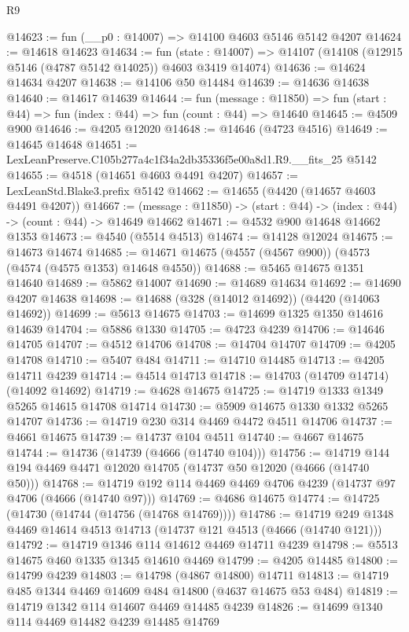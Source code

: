 \begin{lexlean}{R9}
\begin{coremodule}
@14623 := fun (__p0 : @14007) => @14100 @4603 @5146 @5142 @4207
@14624 := @14618 @14623
@14634 := fun (state : @14007) =>
  @14107 (@14108 (@12915 @5146 (@4787 @5142 @14025)) @4603 @3419 @14074)
@14636 := @14624 @14634 @4207
@14638 := @14106 @50 @14484
@14639 := @14636 @14638
@14640 := @14617 @14639
@14644 := fun (message : @11850) =>
  fun (start : @44) => fun (index : @44) => fun (count : @44) => @14640
@14645 := @4509 @900
@14646 := @4205 @12020
@14648 := @14646 (@4723 @4516)
@14649 := @14645 @14648
@14651 := LexLeanPreserve.C105b277a4c1f34a2db35336f5e00a8d1.R9.__fits_25 @5142
@14655 := @4518 (@14651 @4603 @4491 @4207)
@14657 := LexLeanStd.Blake3.prefix @5142
@14662 := @14655 (@4420 (@14657 @4603 @4491 @4207))
@14667 := (message : @11850) -> (start : @44) -> (index : @44) -> (count : @44) -> @14649 @14662
@14671 := @4532 @900 @14648 @14662 @1353
@14673 := @4540 (@5514 @4513)
@14674 := @14128 @12024
@14675 := @14673 @14674
@14685 := @14671 @14675 (@4557 (@4567 @900)) (@4573 (@4574 (@4575 @1353) @14648 @4550))
@14688 := @5465 @14675 @1351 @14640
@14689 := @5862 @14007
@14690 := @14689 @14634
@14692 := @14690 @4207 @14638
@14698 := @14688 (@328 (@14012 @14692)) (@4420 (@14063 @14692))
@14699 := @5613 @14675
@14703 := @14699 @1325 @1350 @14616 @14639
@14704 := @5886 @1330
@14705 := @4723 @4239
@14706 := @14646 @14705
@14707 := @4512 @14706
@14708 := @14704 @14707
@14709 := @4205 @14708
@14710 := @5407 @484
@14711 := @14710 @14485
@14713 := @4205 @14711 @4239
@14714 := @4514 @14713
@14718 := @14703 (@14709 @14714) (@14092 @14692)
@14719 := @4628 @14675
@14725 := @14719 @1333 @1349 @5265 @14615 @14708 @14714
@14730 := @5909 @14675 @1330 @1332 @5265 @14707
@14736 := @14719 @230 @314 @4469 @4472 @4511 @14706
@14737 := @4661 @14675
@14739 := @14737 @104 @4511
@14740 := @4667 @14675
@14744 := @14736 (@14739 (@4666 (@14740 @104)))
@14756 := @14719 @144 @194 @4469 @4471 @12020 @14705 (@14737 @50 @12020 (@4666 (@14740 @50)))
@14768 := @14719 @192 @114 @4469 @4469 @4706 @4239 (@14737 @97 @4706 (@4666 (@14740 @97)))
@14769 := @4686 @14675
@14774 := @14725 (@14730 (@14744 (@14756 (@14768 @14769))))
@14786 := @14719 @249 @1348 @4469 @14614 @4513 @14713 (@14737 @121 @4513 (@4666 (@14740 @121)))
@14792 := @14719 @1346 @114 @14612 @4469 @14711 @4239
@14798 := @5513 @14675 @460 @1335 @1345 @14610 @4469
@14799 := @4205 @14485
@14800 := @14799 @4239
@14803 := @14798 (@4867 @14800) @14711
@14813 := @14719 @485 @1344 @4469 @14609 @484 @14800 (@4637 @14675 @53 @484)
@14819 := @14719 @1342 @114 @14607 @4469 @14485 @4239
@14826 := @14699 @1340 @114 @4469 @14482 @4239 @14485 @14769

\end{coremodule}
\end{lexlean}

